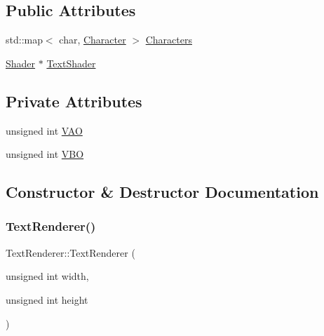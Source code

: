\subsection*{Public Attributes}
\begin{DoxyCompactItemize}
\item 
std\+::map$<$ char, \hyperlink{structCharacter}{Character} $>$ \hyperlink{classTextRenderer_af7bc364007cd449284e88024c59722ba}{Characters}
\item 
\hyperlink{classShader}{Shader} $\ast$ \hyperlink{classTextRenderer_a6faaf96f0f68a45b788a8afdd3847423}{Text\+Shader}
\end{DoxyCompactItemize}
\subsection*{Private Attributes}
\begin{DoxyCompactItemize}
\item 
unsigned int \hyperlink{classTextRenderer_a7fb9e3a97f3e8438907bdde62d99bb6f}{V\+AO}
\item 
unsigned int \hyperlink{classTextRenderer_adcc1ce916e977bb17cc008f820e69b18}{V\+BO}
\end{DoxyCompactItemize}


\subsection{Constructor \& Destructor Documentation}
\mbox{\label{classTextRenderer_ac87978b0da75711662f6627190d5332a}} 
\subsubsection{\texorpdfstring{Text\+Renderer()}{TextRenderer()}}
{\footnotesize\ttfamily Text\+Renderer\+::\+Text\+Renderer (\begin{DoxyParamCaption}\item[{unsigned int}]{width,  }\item[{unsigned int}]{height }\end{DoxyParamCaption})}

\mbox{\label{classTextRenderer_a7087505bdc31e41416408c27fe029f20}} 

